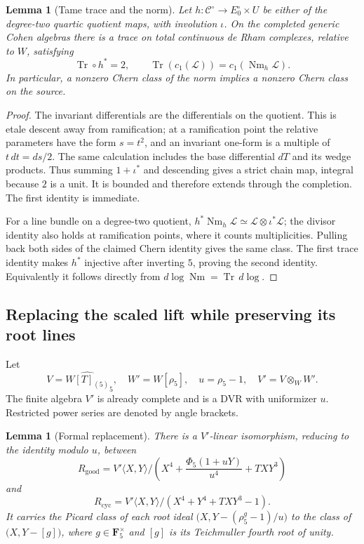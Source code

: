 \documentclass[11pt,a4paper]{article}
\newtheorem{lemma}[theorem]{Lemma}
\theoremstyle{remark}
\begin{document}
\begin{lemma}[Tame trace and the norm]
\label{lem:tameQuarticTrace}
Let $h:\mathcal C^\circ\to E_0^\circ\times U$ be either of the
degree-two quartic quotient maps, with involution $\iota$.  On the
completed generic Cohen algebras there is a trace on total continuous
de Rham complexes, relative to $W$, satisfying
\[
 \operatorname{Tr}\circ h^*=2,\qquad
 \operatorname{Tr}(c_1(\mathcal L))
      =c_1(\operatorname{Nm}_h\mathcal L).
\]
In particular, a nonzero Chern class of the norm implies a nonzero
Chern class on the source.
\end{lemma}

\begin{proof}
The invariant differentials are the differentials on the quotient.
This is etale descent away from ramification; at a ramification point
the relative parameters have the form $s=t^2$, and an invariant
one-form is a multiple of $t\,dt=ds/2$.  The same calculation includes
the base differential $dT$ and its wedge products.  Thus summing
$1+\iota^*$ and descending gives a strict chain map, integral because
$2$ is a unit.  It is bounded and therefore extends through the
completion.  The first identity is immediate.

For a line bundle on a degree-two quotient,
$h^*\operatorname{Nm}_h\mathcal L
 \simeq\mathcal L\otimes\iota^*\mathcal L$; the divisor identity
also holds at ramification points, where it counts multiplicities.
Pulling back both sides of the claimed Chern identity gives the same
class.  The first trace identity makes $h^*$ injective after inverting
$5$, proving the second identity.  Equivalently it follows directly
from $d\log\operatorname{Nm}=\operatorname{Tr}\,d\log$.
\end{proof}

\subsection{Replacing the scaled lift while preserving its root lines}

Let
\[
 V=\widehat{W[T]_{(5)}}_5,
 \quad W'=W[\rho_5],\quad u=\rho_5-1,
 \quad V'=V\otimes_W W'.
\]
The finite algebra $V'$ is already complete and is a DVR with
uniformizer $u$.  Restricted power series are denoted by angle brackets.

\begin{lemma}[Formal replacement]
\label{lem:quarticFormalReplacement}
There is a $V'$-linear isomorphism, reducing to the identity modulo $u$,
between
\[
 R_{\mathrm{good}}=
 V'\langle X,Y\rangle/
 \left(X^4+\frac{\Phi_5(1+uY)}{u^4}+TXY^3\right)
\]
and
\[
 R_{\mathrm{cyc}}=
 V'\langle X,Y\rangle/(X^4+Y^4+TXY^3-1).
\]
It carries the Picard class of each root ideal
$\bigl(X,Y-(\rho_5^g-1)/u\bigr)$ to the class of
$\bigl(X,Y-[g]\bigr)$, where $g\in\mathbf F_5^\times$ and $[g]$
is its Teichmuller fourth root of unity.
\end{lemma}
\end{document}
